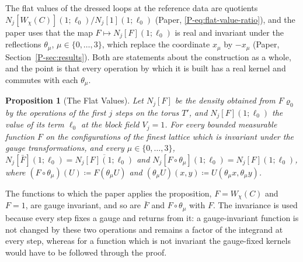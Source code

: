 \documentclass[11pt]{preprint}
\numberwithin{equation}{section}
\newtheorem{proposition}{Proposition}
\theoremstyle{definition}
\theoremstyle{remark}
\theoremstyle{plain}
\begin{document}
The flat values of the dressed loops at the reference data are quotients $N_j[W_\chi(C)](1; \ell_0)/N_j[1](1; \ell_0)$ (Paper, \eqref{P-eq:flat-value-ratio}), and the paper uses that the map $F \mapsto N_j[F](1; \ell_0)$ is real and invariant under the reflections $\theta_\mu$, $\mu \in \{ 0, \dots, 3 \}$, which replace the coordinate $x_\mu$ by $-x_\mu$ (Paper, Section~\ref{P-sec:results}). Both are statements about the construction as a whole, and the point is that every operation by which it is built has a real kernel and commutes with each $\theta_\mu$.

\begin{proposition}[The Flat Values]\label{prop:flat-values}
Let $N_j[F]$ be the density obtained from $F\varrho_0$ by the operations of the first $j$ steps on the torus $T'$, and $N_j[F](1; \ell_0)$ the value of its term $\ell_0$ at the block field $V_j = 1$. For every bounded measurable function $F$ on the configurations of the finest lattice which is invariant under the gauge transformations, and every $\mu \in \{ 0, \dots, 3 \}$, $N_j[\bar F](1; \ell_0) = \overline{N_j[F](1; \ell_0)}$ and $N_j[F \circ \theta_\mu](1; \ell_0) = N_j[F](1; \ell_0)$, where $(F \circ \theta_\mu)(U) \coloneqq F(\theta_\mu U)$ and $(\theta_\mu U)(x, y) \coloneqq U(\theta_\mu x, \theta_\mu y)$.
\end{proposition}

The functions to which the paper applies the proposition, $F = W_\chi(C)$ and $F = 1$, are gauge invariant, and so are $\bar F$ and $F \circ \theta_\mu$ with $F$. The invariance is used because every step fixes a gauge and returns from it: a gauge-invariant function is not changed by these two operations and remains a factor of the integrand at every step, whereas for a function which is not invariant the gauge-fixed kernels would have to be followed through the proof.
\end{document}
